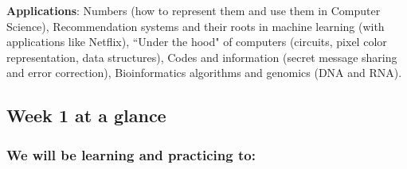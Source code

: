\documentclass[12pt, oneside]{article}
\begin{document}
{\bf Applications}: Numbers (how to represent them and use them in Computer Science), 
Recommendation systems and their roots in machine learning (with applications like Netflix),
``Under the hood" of computers (circuits, pixel color representation, data structures),
Codes and information (secret message sharing and error correction),
Bioinformatics algorithms and genomics (DNA and RNA).


\subsection*{Week 1 at a glance}

\subsubsection*{We will be learning and practicing to:}
\end{document}
